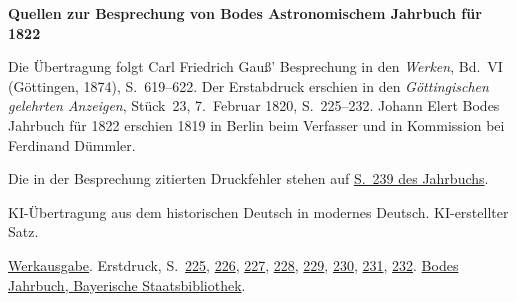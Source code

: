 \clearpage\thispagestyle{empty}
\begin{center}\Large\bfseries Quellen zur Besprechung von Bodes Astronomischem Jahrbuch für 1822\end{center}

Die Übertragung folgt Carl Friedrich Gauß’ Besprechung in den \emph{Werken}, Bd.~VI (Göttingen, 1874), S.~619--622. Der Erstabdruck erschien in den \emph{Göttingischen gelehrten Anzeigen}, Stück~23, 7.~Februar 1820, S.~225--232. Johann Elert Bodes Jahrbuch für 1822 erschien 1819 in Berlin beim Verfasser und in Kommission bei Ferdinand Dümmler.

Die in der Besprechung zitierten Druckfehler stehen auf \href{https://api.digitale-sammlungen.de/iiif/image/v2/bsb10538351_00245/full/1650,/0/default.jpg}{S.~239 des Jahrbuchs}.

KI-Übertragung aus dem historischen Deutsch in modernes Deutsch. KI-erstellter Satz.

\href{https://gdz.sub.uni-goettingen.de/id/PPN236007467}{Werkausgabe}. Erstdruck, S.~\href{https://images.p.sub.uni-goettingen.de/iiif/image/gdz:PPN319721507_1820:00000219/full/1650,/0/default.jpg}{225}, \href{https://images.p.sub.uni-goettingen.de/iiif/image/gdz:PPN319721507_1820:00000220/full/1650,/0/default.jpg}{226}, \href{https://images.p.sub.uni-goettingen.de/iiif/image/gdz:PPN319721507_1820:00000221/full/1650,/0/default.jpg}{227}, \href{https://images.p.sub.uni-goettingen.de/iiif/image/gdz:PPN319721507_1820:00000222/full/1650,/0/default.jpg}{228}, \href{https://images.p.sub.uni-goettingen.de/iiif/image/gdz:PPN319721507_1820:00000223/full/1650,/0/default.jpg}{229}, \href{https://images.p.sub.uni-goettingen.de/iiif/image/gdz:PPN319721507_1820:00000224/full/1650,/0/default.jpg}{230}, \href{https://images.p.sub.uni-goettingen.de/iiif/image/gdz:PPN319721507_1820:00000225/full/1650,/0/default.jpg}{231}, \href{https://images.p.sub.uni-goettingen.de/iiif/image/gdz:PPN319721507_1820:00000226/full/1650,/0/default.jpg}{232}. \href{https://api.digitale-sammlungen.de/iiif/image/v2/bsb10538351_00003/full/1650,/0/default.jpg}{Bodes Jahrbuch, Bayerische Staatsbibliothek}.

\clearpage
